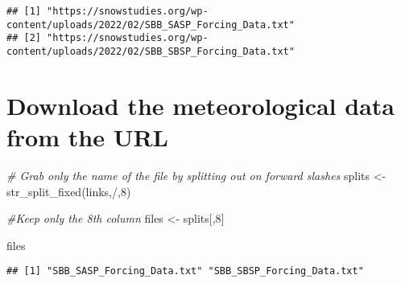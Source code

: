 \documentclass[
]{book}
\newenvironment{Shaded}{\begin{snugshade}}{\end{snugshade}}
\newcommand{\CommentTok}[1]{\textcolor[rgb]{0.56,0.35,0.01}{\textit{#1}}}
\newcommand{\DecValTok}[1]{\textcolor[rgb]{0.00,0.00,0.81}{#1}}
\newcommand{\FunctionTok}[1]{\textcolor[rgb]{0.00,0.00,0.00}{#1}}
\newcommand{\NormalTok}[1]{#1}
\newcommand{\OtherTok}[1]{\textcolor[rgb]{0.56,0.35,0.01}{#1}}
\newcommand{\StringTok}[1]{\textcolor[rgb]{0.31,0.60,0.02}{#1}}
\begin{document}
\begin{verbatim}
## [1] "https://snowstudies.org/wp-content/uploads/2022/02/SBB_SASP_Forcing_Data.txt"
## [2] "https://snowstudies.org/wp-content/uploads/2022/02/SBB_SBSP_Forcing_Data.txt"
\end{verbatim}

\hypertarget{download-the-meteorological-data-from-the-url}{%
\section{Download the meteorological data from the URL}\label{download-the-meteorological-data-from-the-url}}

\begin{Shaded}
\begin{Highlighting}[]
\CommentTok{\# Grab only the name of the file by splitting out on forward slashes}
\NormalTok{splits }\OtherTok{\textless{}{-}} \FunctionTok{str\_split\_fixed}\NormalTok{(links,}\StringTok{\textquotesingle{}/\textquotesingle{}}\NormalTok{,}\DecValTok{8}\NormalTok{)}

\CommentTok{\#Keep only the 8th column}
\NormalTok{files }\OtherTok{\textless{}{-}}\NormalTok{ splits[,}\DecValTok{8}\NormalTok{] }

\NormalTok{files}
\end{Highlighting}
\end{Shaded}

\begin{verbatim}
## [1] "SBB_SASP_Forcing_Data.txt" "SBB_SBSP_Forcing_Data.txt"
\end{verbatim}
\end{document}
